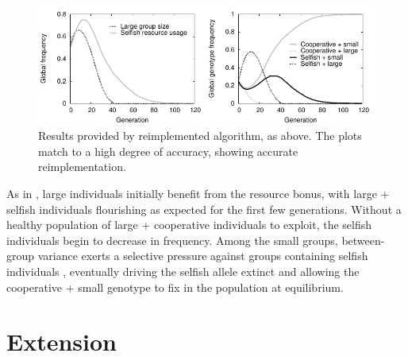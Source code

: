 \documentclass[11pt]{article}
\begin{document}
\begin{figure}[!ht]
  \centering
  \includegraphics{equalplot.pdf}
  \caption{Results provided by reimplemented algorithm, as above. The plots match to a high degree of accuracy, showing accurate reimplementation. 
  }
  \label{fig:equalplot}
\end{figure}

As in \citet{orig}, large individuals initially benefit from the resource bonus, with large + selfish individuals flourishing as expected for the first few generations. Without a healthy population of large + cooperative individuals to exploit, the selfish individuals begin to decrease in frequency. Among the small groups, between-group variance exerts a selective pressure against groups containing selfish individuals \citep{Watson2011}, eventually driving the selfish allele extinct and allowing the cooperative + small genotype to fix in the population at equilibrium.

\clearpage
\section{Extension}

\end{document}
